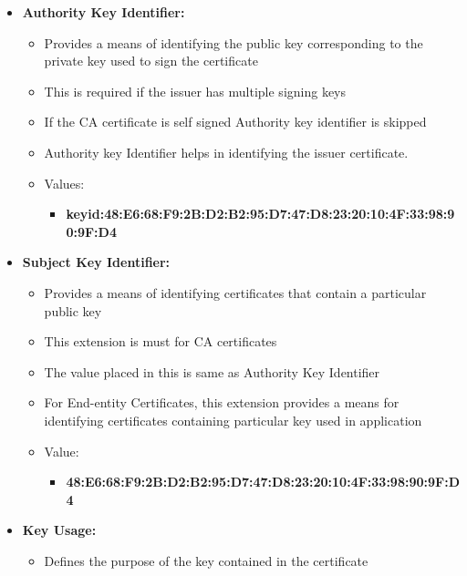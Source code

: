 \documentclass[12pt]{report}
\begin{document}
        \begin{itemize}
            \item \textbf{Authority Key Identifier:}
                \begin{itemize}
                    \item Provides a means of identifying the public key corresponding to the private key used to sign the certificate
                    \item This is required if the issuer has multiple signing keys 
                    \item If the CA certificate is self signed Authority key identifier is skipped
                    \item Authority key Identifier helps in identifying the issuer certificate. 
                    \item Values:
                        \begin{itemize}
                            \item \textbf{keyid:48:E6:68:F9:2B:D2:B2:95:D7:47:D8:23:20:10:4F:33:98:90:9F:D4}
                        \end{itemize}
                \end{itemize}
            \item \textbf{Subject Key Identifier:}
                \begin{itemize}
                    \item Provides a means of identifying certificates that contain a particular public key
                    \item This extension is must for CA certificates
                    \item The value placed in this is same as Authority Key Identifier
                    \item For End-entity Certificates, this extension provides a means for identifying certificates containing particular key used in application
                    \item Value:
                        \begin{itemize}
                            \item \textbf{48:E6:68:F9:2B:D2:B2:95:D7:47:D8:23:20:10:4F:33:98:90:9F:D4}
                        \end{itemize}
                \end{itemize}
            \item \textbf{Key Usage:}
                \begin{itemize}
                    \item Defines the purpose of the key contained in the certificate 

\end{itemize}
\end{itemize}
\end{document}
